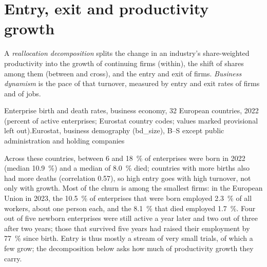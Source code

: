 \section{Entry, exit and productivity growth}\label{sec:b3:platforms-and-innovation:reallocation}

\begin{definition}\label{def:b3:platforms-and-innovation:reallocation}
A \emph{reallocation decomposition} splits the change in an industry's
share-weighted productivity into the growth of continuing firms (within), the shift
of shares among them (between and cross), and the entry and exit of firms.
\emph{Business dynamism} is the pace of that turnover, measured by entry and exit
rates of firms and of jobs.
\end{definition}

\begin{omchart}{Enterprise birth and death rates, business economy, 32 European
countries, 2022 (percent of active enterprises; Eurostat country codes; values
marked provisional left out).}{Eurostat, business demography (bd\_size), B--S except
public administration and holding companies}
\end{omchart}

Across these countries, between 6 and 18~\% of enterprises were born in 2022 (median
10.9~\%) and a median of 8.0~\% died; countries with more births also had more deaths
(correlation 0.57), so high entry goes with high turnover, not only with growth. Most
of the churn is among the smallest firms: in the European Union in 2023, the 10.5~\%
of enterprises that were born employed 2.3~\% of all workers, about one person each,
and the 8.1~\% that died employed 1.7~\%. Four out of five newborn enterprises were
still active a year later and two out of three after two years; those that survived
five years had raised their employment by 77~\% since birth. Entry is thus mostly a
stream of very small trials, of which a few grow; the decomposition below asks how
much of productivity growth they carry.

